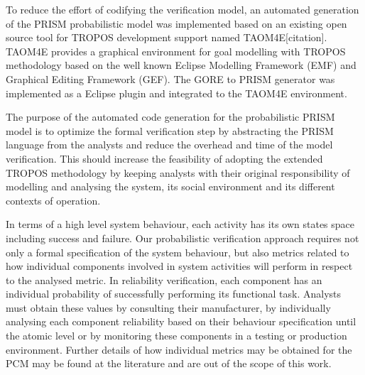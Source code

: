 To reduce the effort of codifying the verification model, an automated generation of the PRISM probabilistic model was implemented based on an existing open source tool for TROPOS development support named TAOM4E[citation]. TAOM4E provides a graphical environment for goal modelling with TROPOS methodology based on the well known Eclipse Modelling Framework (EMF) and Graphical Editing Framework (GEF). The GORE to PRISM generator was implemented as a Eclipse plugin and integrated to the TAOM4E environment. 

The purpose  of the automated code generation for the probabilistic PRISM model is to optimize the formal verification step by abstracting the PRISM language from the analysts and reduce the overhead and time of the model verification. This should increase the feasibility of adopting the extended TROPOS methodology by keeping analysts with their original responsibility of modelling and analysing the system, its social environment and its different contexts of operation.





In terms of a high level system behaviour, each activity has its own states space including success and failure. Our probabilistic verification approach requires not only a formal specification of the system behaviour, but also metrics related to how individual components involved in system activities will perform in respect to the analysed metric. In reliability verification, each component has an individual probability of successfully performing its functional task. Analysts must obtain these values by consulting their manufacturer, by individually analysing each component reliability based on their behaviour specification until the atomic level or by monitoring these components in a testing or production environment. Further details of how individual metrics may be obtained for the PCM may be found at the literature and are out of the scope of this work.
